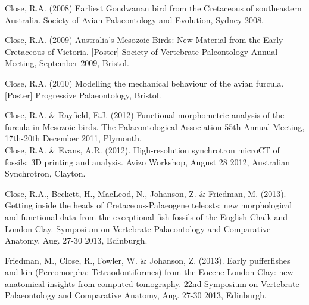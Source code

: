 \documentclass[a4paper, oneside, final]{scrartcl} %
\begin{document}
\begin{center}
\begin{flushleft}
Close, R.A. (2008) Earliest Gondwanan bird from the Cretaceous of southeastern Australia. Society of Avian Palaeontology and Evolution, Sydney 2008.\\

\vspace{6pt}

Close, R.A. (2009) Australia's Mesozoic Birds: New Material from the Early Cretaceous of Victoria. [Poster] Society of Vertebrate Paleontology Annual Meeting, September 2009, Bristol.\\

\vspace{6pt}

Close, R.A. (2010) Modelling the mechanical behaviour of the avian furcula. [Poster] Progressive Palaeontology, Bristol.\\

\vspace{6pt}

Close, R.A. \& Rayfield, E.J. (2012) Functional morphometric analysis of the furcula in Mesozoic birds. The Palaeontological Association 55th Annual Meeting, 17th-20th December 2011, Plymouth.\\

\vspace{6pt}
Close, R.A. \& Evans, A.R. (2012). High-resolution synchrotron microCT of fossils: 3D printing and analysis. Avizo Workshop, August 28 2012, Australian Synchrotron, Clayton.\\

\vspace{6pt}

Close, R.A., Beckett, H., MacLeod, N., Johanson, Z. \& Friedman, M. (2013). Getting inside the heads of Cretaceous-Palaeogene teleosts: new morphological and functional data from the exceptional fish fossils of the English Chalk and London Clay. Symposium on Vertebrate Palaeontology and Comparative Anatomy, Aug. 27-30 2013, Edinburgh.\\

\vspace{6pt}

\begin{samepage}
Friedman, M., Close, R., Fowler, W. \& Johanson, Z. (2013). Early pufferfishes and kin (Percomorpha: Tetraodontiformes) from the Eocene London Clay: new anatomical insights from computed tomography. 22nd Symposium on Vertebrate Palaeontology and Comparative Anatomy, Aug. 27-30 2013, Edinburgh.\\
\end{samepage}


\end{flushleft}
\end{center}
\end{document}
